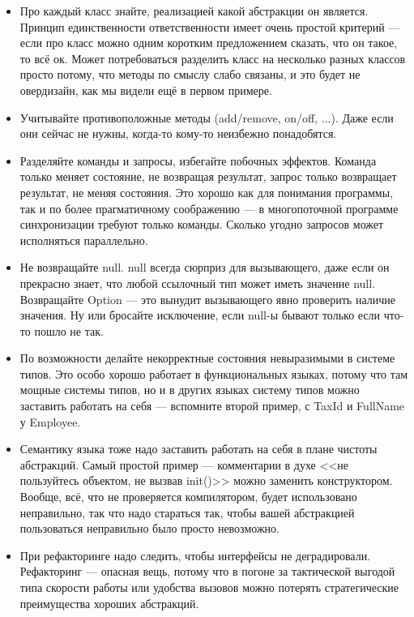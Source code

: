 \documentclass[a5paper]{article}
\begin{document}
\begin{itemize}
    \item Про каждый класс знайте, реализацией какой абстракции он является. Принцип единственности ответственности имеет очень простой критерий --- если про класс можно одним коротким предложением сказать, что он такое, то всё ок. Может потребоваться разделить класс на несколько разных классов просто потому, что методы по смыслу слабо связаны, и это будет не овердизайн, как мы видели ещё в первом примере.
    \item Учитывайте противоположные методы (add/remove, on/off, ...). Даже если они сейчас не нужны, когда-то кому-то неизбежно понадобятся.
    \item Разделяйте команды и запросы, избегайте побочных эффектов. Команда только меняет состояние, не возвращая результат, запрос только возвращает результат, не меняя состояния. Это хорошо как для понимания программы, так и по более прагматичному соображению --- в многопоточной программе синхронизации требуют только команды. Сколько угодно запросов может исполняться параллельно.
    \item Не возвращайте null. null всегда сюрприз для вызывающего, даже если он прекрасно знает, что любой ссылочный тип может иметь значение null. Возвращайте Option --- это вынудит вызывающего явно проверить наличие значения. Ну или бросайте исключение, если null-ы бывают только если что-то пошло не так.
    \item По возможности делайте некорректные состояния невыразимыми в системе типов. Это особо хорошо работает в функциональных языках, потому что там мощные системы типов, но и в других языках систему типов можно заставить работать на себя --- вспомните второй пример, с TaxId и FullName у Employee.
    \item Семантику языка тоже надо заставить работать на себя в плане чистоты абстракций. Самый простой пример --- комментарии в духе <<не пользуйтесь объектом, не вызвав  init()>> можно заменить конструктором. Вообще, всё, что не проверяется компилятором, будет использовано неправильно, так что надо стараться так, чтобы вашей абстракцией пользоваться неправильно было просто невозможно.
    \item При рефакторинге надо следить, чтобы интерфейсы не деградировали. Рефакторинг --- опасная вещь, потому что в погоне за тактической выгодой типа скорости работы или удобства вызовов можно потерять стратегические преимущества хороших абстракций.
\end{itemize}
\end{document}
